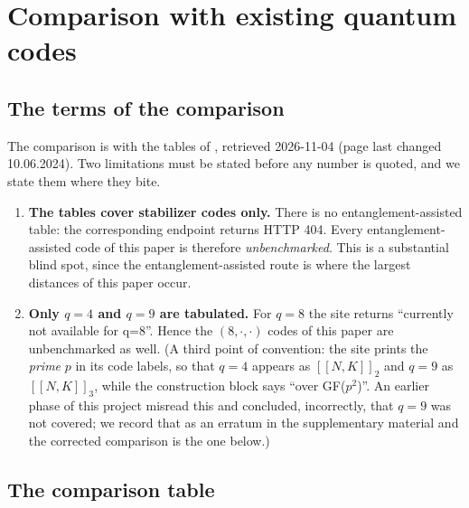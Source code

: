 \section{Comparison with existing quantum codes}
\label{sec:cmp}

\subsection{The terms of the comparison}

The comparison is with the tables of \cite{GrasslCodetables}, retrieved
2026-11-04 (page last changed 10.06.2024). Two limitations must be stated
before any number is quoted, and we state them where they bite.

\begin{enumerate}[label=\textnormal{(\arabic*)},leftmargin=*]
\item \textbf{The tables cover stabilizer codes only.} There is no
  entanglement-assisted table: the corresponding endpoint returns HTTP 404.
  Every entanglement-assisted code of this paper is therefore
  \emph{unbenchmarked}. This is a substantial blind spot, since the
  entanglement-assisted route is where the largest distances of this paper
  occur.
\item \textbf{Only $q=4$ and $q=9$ are tabulated.} For $q=8$ the site returns
  ``currently not available for q=8''. Hence the $(8,\cdot,\cdot)$ codes of this
  paper are unbenchmarked as well. (A third point of convention: the site prints
  the \emph{prime} $p$ in its code labels, so that $q=4$ appears as
  $[[N,K]]_2$ and $q=9$ as $[[N,K]]_3$, while the construction block says
  ``over GF($p^2$)''. An earlier phase of this project misread this and
  concluded, incorrectly, that $q=9$ was not covered; we record that as an
  erratum in the supplementary material and the corrected comparison is the one
  below.)
\end{enumerate}

\subsection{The comparison table}

